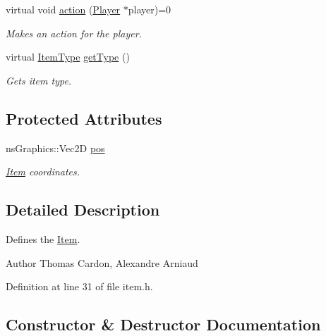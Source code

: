 \begin{DoxyCompactItemize}
virtual void \hyperlink{structns_game_1_1_item_af74dffcf9bde4a4297749f4e1852395b}{action} (\hyperlink{classns_game_1_1_player}{Player} $\ast$player)=0
\begin{DoxyCompactList}\small\item\em Makes an action for the player. \end{DoxyCompactList}\item 
virtual \hyperlink{namespacens_game_a5f7db01e6447720e9a145f0b3c68a4d7}{Item\+Type} \hyperlink{structns_game_1_1_item_a69156550e5083928cbb673ca2db671f5}{get\+Type} ()
\begin{DoxyCompactList}\small\item\em Gets item type. \end{DoxyCompactList}\end{DoxyCompactItemize}
\subsection*{Protected Attributes}
\begin{DoxyCompactItemize}
\item 
ns\+Graphics\+::\+Vec2D \hyperlink{structns_game_1_1_item_a5518876a13f3d2eda659d29748097f1a}{pos}
\begin{DoxyCompactList}\small\item\em \hyperlink{structns_game_1_1_item}{Item} coordinates. \end{DoxyCompactList}\end{DoxyCompactItemize}


\subsection{Detailed Description}
Defines the \hyperlink{structns_game_1_1_item}{Item}. 

\begin{DoxyAuthor}{Author}
Thomas Cardon, Alexandre Arniaud 
\end{DoxyAuthor}


Definition at line 31 of file item.\+h.



\subsection{Constructor \& Destructor Documentation}
\mbox{\label{structns_game_1_1_item_a7b70bf14fdd5c660ac1181f86482685b}} 

